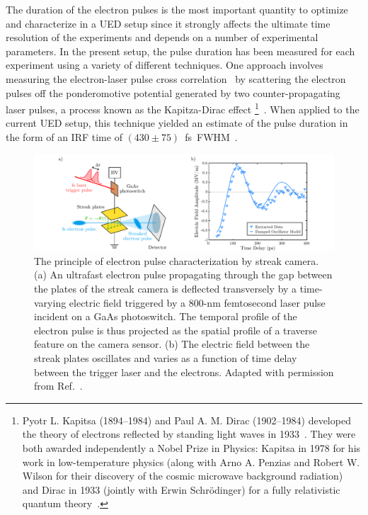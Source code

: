 The duration of the electron pulses is the most important quantity to optimize and
characterize in a UED setup since it strongly affects the ultimate time resolution of
the experiments and depends on a number of experimental parameters.
In the present setup, the pulse duration has been measured for each experiment
using a variety of different techniques. One approach involves measuring
the electron-laser pulse cross correlation~\cite{Siwick2005, Hebeisen2006, Gao2012}
by scattering the electron pulses off the ponderomotive potential generated
by two counter-propagating laser pulses,
a process known as the Kapitza-Dirac effect%
\footnote{Pyotr L. Kapitsa (1894--1984) and Paul A. M. Dirac (1902--1984)
developed the theory of electrons reflected by standing light waves in 1933~\cite{Kapitza1933}.
They were both awarded independently a Nobel Prize in Physics:
Kapitsa in 1978 for his work in low-temperature physics
(along with Arno A. Penzias and Robert W. Wilson
for their discovery of the cosmic microwave background radiation)~\cite{Nobel1971}
and Dirac in 1933 (jointly with Erwin Schr\"{o}dinger)
for a fully relativistic quantum theory~\cite{Nobel1901}.}~\cite{Freimund2001}.
When applied to the current UED setup, this technique yielded an estimate of the pulse duration
in the form of an IRF time of $(430 \pm 75)$~fs~FWHM~\cite{Gao2012}.

\begin{figure}[ht!]
  \centering
  \includegraphics[width = \textwidth]{Figures/fig_ch2_streak-camera.pdf}
  \caption[The principle of electron pulse characterization by streak camera.]{
    The principle of electron pulse characterization by streak camera.
    (a) An ultrafast electron pulse propagating through the gap between the plates of the streak camera
    is deflected transversely by a time-varying electric field triggered by a 800-nm femtosecond laser pulse
    incident on a GaAs photoswitch. The temporal profile of the electron pulse is thus projected
    as the spatial profile of a traverse feature on the camera sensor.
    (b) The electric field between the streak plates oscillates and varies as a function of time delay
    between the trigger laser and the electrons.
    Adapted with permission from Ref.~\cite{Kassier2010}.
  }
  \label{fig: streak-camera}
\end{figure}


